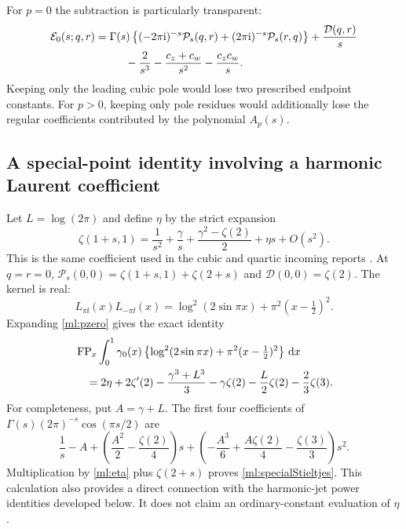 For $p=0$ the subtraction is particularly transparent:
\begin{align}
 \mathcal E_0(s;q,r)={}&\Gamma(s)
   \left\{(-2\pi\mathrm i)^{-s}\mathcal P_s(q,r)
                        +(2\pi\mathrm i)^{-s}\mathcal P_s(r,q)\right\}
     +\frac{\mathcal D(q,r)}s\notag\\
 &\hspace{5mm}-\frac2{s^3}-\frac{c_z+c_w}{s^2}-\frac{c_zc_w}s.
       \label{ml:pzero}
\end{align}
Keeping only the leading cubic pole would lose two prescribed endpoint
constants. For $p>0$, keeping only pole residues would additionally lose
the regular coefficients contributed by the polynomial $A_p(s)$.

\subsection{A special-point identity involving a harmonic Laurent coefficient}

Let $L=\log(2\pi)$ and define $\eta$ by the strict expansion
\begin{equation}\label{ml:eta}
 \zeta(1+s,1)=\frac1{s^2}+\frac\gamma s
       +\frac{\gamma^2-\zeta(2)}2+\eta s+O(s^2).
\end{equation}
This is the same coefficient used in the cubic and quartic incoming
reports \cite{repo:cubic,repo:barnes}. At $q=r=0$,
$\mathcal P_s(0,0)=\zeta(1+s,1)+\zeta(2+s)$ and
$\mathcal D(0,0)=\zeta(2)$. The kernel is real:
\[
 L_{\pi\ii}(x)L_{-\pi\ii}(x)
      =\log^2(2\sin\pi x)+\pi^2(x-\tfrac12)^2.
\]
Expanding \eqref{ml:pzero} gives the exact identity
\begin{align}
 &\operatorname{FP}_x\int_0^1\gamma_0(x)
       \left\{\log^2(2\sin\pi x)+\pi^2(x-\tfrac12)^2\right\}\,\mathrm d x
       \notag\\
 &\quad=2\eta+2\zeta'(2)-\frac{\gamma^3+L^3}{3}
                -\gamma\zeta(2)-\frac L2\zeta(2)-\frac23\zeta(3).
       \label{ml:specialStieltjes}
\end{align}
For completeness, put $A=\gamma+L$. The first four coefficients of
$\Gamma(s)(2\pi)^{-s}\cos(\pi s/2)$ are
\[
 \frac1s-A+\left(\frac{A^2}{2}-\frac{\zeta(2)}4\right)s
    +\left(-\frac{A^3}{6}+\frac{A\zeta(2)}4-\frac{\zeta(3)}3\right)s^2.
\]
Multiplication by \eqref{ml:eta} plus $\zeta(2+s)$ proves
\eqref{ml:specialStieltjes}. This calculation also provides a direct
connection with the harmonic-jet power identities developed below.
It does not claim an ordinary-constant evaluation of $\eta$.

